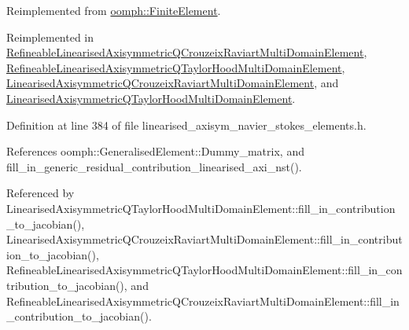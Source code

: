 Reimplemented from \hyperlink{classoomph_1_1FiniteElement_a0ae7af222af38a0d53bf283dc85bdfea}{oomph\+::\+Finite\+Element}.



Reimplemented in \hyperlink{classRefineableLinearisedAxisymmetricQCrouzeixRaviartMultiDomainElement_a5040c64ce7752b950ee33fa18e8eb7c1}{Refineable\+Linearised\+Axisymmetric\+Q\+Crouzeix\+Raviart\+Multi\+Domain\+Element}, \hyperlink{classRefineableLinearisedAxisymmetricQTaylorHoodMultiDomainElement_a057d824e17f4e7ed12b496629dfe67fd}{Refineable\+Linearised\+Axisymmetric\+Q\+Taylor\+Hood\+Multi\+Domain\+Element}, \hyperlink{classLinearisedAxisymmetricQCrouzeixRaviartMultiDomainElement_a3920198ff369a194c7d0ca4628af1a8c}{Linearised\+Axisymmetric\+Q\+Crouzeix\+Raviart\+Multi\+Domain\+Element}, and \hyperlink{classLinearisedAxisymmetricQTaylorHoodMultiDomainElement_adc20fbe7a713cb4b1d80c750698416ed}{Linearised\+Axisymmetric\+Q\+Taylor\+Hood\+Multi\+Domain\+Element}.



Definition at line 384 of file linearised\+\_\+axisym\+\_\+navier\+\_\+stokes\+\_\+elements.\+h.



References oomph\+::\+Generalised\+Element\+::\+Dummy\+\_\+matrix, and fill\+\_\+in\+\_\+generic\+\_\+residual\+\_\+contribution\+\_\+linearised\+\_\+axi\+\_\+nst().



Referenced by Linearised\+Axisymmetric\+Q\+Taylor\+Hood\+Multi\+Domain\+Element\+::fill\+\_\+in\+\_\+contribution\+\_\+to\+\_\+jacobian(), Linearised\+Axisymmetric\+Q\+Crouzeix\+Raviart\+Multi\+Domain\+Element\+::fill\+\_\+in\+\_\+contribution\+\_\+to\+\_\+jacobian(), Refineable\+Linearised\+Axisymmetric\+Q\+Taylor\+Hood\+Multi\+Domain\+Element\+::fill\+\_\+in\+\_\+contribution\+\_\+to\+\_\+jacobian(), and Refineable\+Linearised\+Axisymmetric\+Q\+Crouzeix\+Raviart\+Multi\+Domain\+Element\+::fill\+\_\+in\+\_\+contribution\+\_\+to\+\_\+jacobian().

\mbox{\label{classoomph_1_1LinearisedAxisymmetricNavierStokesEquations_a3dc10c4b27bee432c8536a7213c70050}} 

